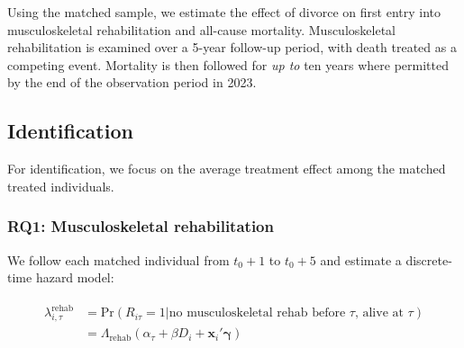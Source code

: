 \documentclass[a4paper,12pt]{article}
\theoremstyle{plain}
\theoremstyle{definition}
\theoremstyle{TheoremNum}
\theoremstyle{CorollaryNum}
\theoremstyle{PropositionNum}
\theoremstyle{TheoremNum}
\begin{document}





Using the matched sample, we estimate the effect of divorce on first entry into musculoskeletal rehabilitation and all-cause mortality. Musculoskeletal rehabilitation is examined over a 5-year follow-up period, with death treated as a competing event. Mortality is then followed for \textit{up to} ten years where permitted by the end of the observation period in 2023.


\subsection{Identification}

For identification, we focus on the average treatment effect among the matched treated individuals. 
\subsubsection{RQ1: Musculoskeletal rehabilitation}

We follow each matched individual from $t_0+1$ to $t_0+5$ and estimate a discrete-time hazard model:

\begin{align}
\begin{split}
 \lambda_{i,\tau}^{\text{rehab}} & = \text{Pr}(R_{i \tau} = 1 | \text{no musculoskeletal rehab before $\tau$, alive at $\tau$}) \\
 & = \Lambda_{\text{rehab}}\left(\alpha_\tau + \beta D_i + \mathbf{x}_i'\mathbf{\gamma}\right)
\end{split}
\tag{1}\label{eq:rq1_equation}
\end{align}
\end{document}
